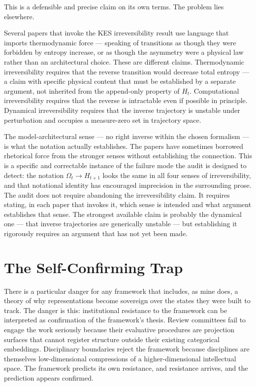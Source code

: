 \documentclass[12pt, a4paper]{article}
\begin{document}
This is a defensible and precise claim on its own terms. The problem lies elsewhere.

Several papers that invoke the KES irreversibility result use language that imports thermodynamic force --- speaking of transitions as though they were forbidden by entropy increase, or as though the asymmetry were a physical law rather than an architectural choice. These are different claims. Thermodynamic irreversibility requires that the reverse transition would decrease total entropy --- a claim with specific physical content that must be established by a separate argument, not inherited from the append-only property of $H_t$. Computational irreversibility requires that the reverse is intractable even if possible in principle. Dynamical irreversibility requires that the inverse trajectory is unstable under perturbation and occupies a measure-zero set in trajectory space.

The model-architectural sense --- no right inverse within the chosen formalism --- is what the notation actually establishes. The papers have sometimes borrowed rhetorical force from the stronger senses without establishing the connection. This is a specific and correctable instance of the failure mode the audit is designed to detect: the notation $\Omega_t \to H_{t+1}$ looks the same in all four senses of irreversibility, and that notational identity has encouraged imprecision in the surrounding prose. The audit does not require abandoning the irreversibility claim. It requires stating, in each paper that invokes it, which sense is intended and what argument establishes that sense. The strongest available claim is probably the dynamical one --- that inverse trajectories are generically unstable --- but establishing it rigorously requires an argument that has not yet been made.

\section{The Self-Confirming Trap}

There is a particular danger for any framework that includes, as mine does, a theory of why representations become sovereign over the states they were built to track. The danger is this: institutional resistance to the framework can be interpreted as confirmation of the framework's thesis. Review committees fail to engage the work seriously because their evaluative procedures are projection surfaces that cannot register structure outside their existing categorical embeddings. Disciplinary boundaries reject the framework because disciplines are themselves low-dimensional compressions of a higher-dimensional intellectual space. The framework predicts its own resistance, and resistance arrives, and the prediction appears confirmed.
\end{document}
